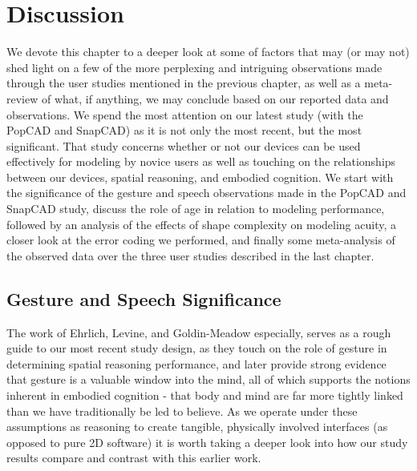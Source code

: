 \chapter{Discussion}
\label{discussion}

We devote this chapter to a deeper look at some of factors that may (or may not)
shed light on a few of the more perplexing and intriguing observations made
through the user studies mentioned in the previous chapter, as well as a
meta-review of what, if anything, we may conclude based on our reported data and
observations. We spend the most attention on our latest study (with the PopCAD
and SnapCAD) as it is not only the most recent, but the most significant. That
study concerns whether or not our devices can be used effectively for modeling
by novice users as well as touching on the relationships between our devices,
spatial reasoning, and embodied cognition. We start with the significance of the
gesture and speech observations made in the PopCAD and SnapCAD study, discuss
the role of age in relation to modeling performance, followed by an analysis of
the effects of shape complexity on modeling acuity, a closer look at the error
coding we performed, and finally some meta-analysis of the observed data over
the three user studies described in the last chapter.


\section{Gesture and Speech Significance}

The work of Ehrlich\cite{ehrlich2006importance}, Levine\cite{levine1999early},
and Goldin-Meadow especially\cite{goldin}\cite{goldin2005hearing}, serves as a
rough guide to our most recent study design, as they touch on the role of
gesture in determining spatial reasoning performance, and later provide strong
evidence that gesture is a valuable window into the mind, all of which supports
the notions inherent in embodied cognition - that body and mind are far more
tightly linked than we have traditionally be led to believe. As we operate under
these assumptions as reasoning to create tangible, physically involved
interfaces (as opposed to pure 2D software) it is worth taking a deeper look
into how our study results compare and contrast with this earlier work.

